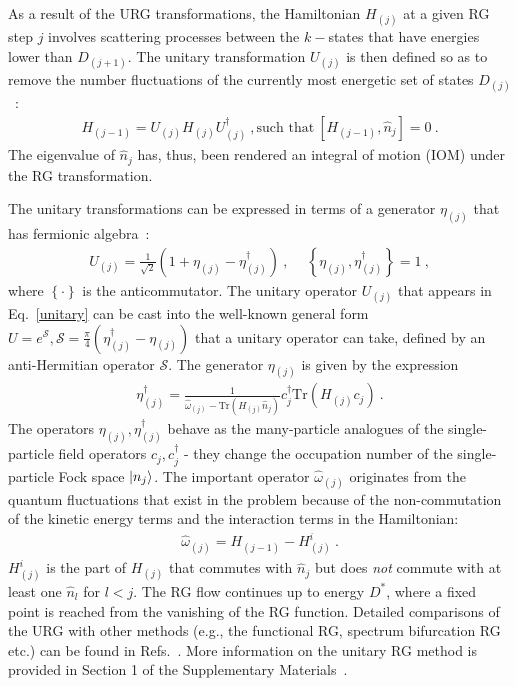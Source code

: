\documentclass{iopart}
\begin{document}
As a result of the URG transformations, the Hamiltonian \(H_{(j)}\) at a given RG step \(j\) involves scattering processes between the \(k-\)states that have energies lower than \(D_{(j+1)}\). The unitary transformation \(U_{(j)}\) is then defined so as to remove the number fluctuations of the currently most energetic set of states \(D_{(j)}\)~\cite{anirbanurg1,anirbanurg2}:
\begin{eqnarray}
	H_{(j-1)} = U_{(j)} H_{(j)} U^\dagger_{(j)}~, \text{such that} ~\left[H_{(j-1)}, \hat n_{j}\right] =0~.
\end{eqnarray}
The eigenvalue of $\hat{n}_{j}$ has, thus, been rendered an integral of motion (IOM) under the RG transformation.

The unitary transformations can be expressed in terms of a generator \(\eta_{(j)}\) that has fermionic algebra~\cite{anirbanurg1,anirbanurg2}:
\begin{eqnarray}
	\label{unitary}
	U_{(j)} = \frac{1}{\sqrt 2}\left(1 + \eta_{(j)} - \eta_{(j)}^\dagger\right)~,~ \quad\left\{ \eta_{(j)},\eta_{(j)}^\dagger \right\} = 1~,
\end{eqnarray}
where \(\left\{\cdot\right\}\) is the anticommutator. The unitary operator \(U_{(j)}\) that appears in Eq.~\eqref{unitary} can be cast into the well-known general form \(U = e^\mathcal{S}, \mathcal{S} = \frac{\pi}{4}\left( \eta^\dagger_{(j)} - \eta_{(j)} \right)\) that a unitary operator can take, defined by an anti-Hermitian operator \(\mathcal{S}\). The generator \(\eta_{(j)}\) is given by the expression~\cite{anirbanurg1,anirbanurg2}
\begin{eqnarray}
	\eta^\dagger_{(j)} = \frac{1}{\hat \omega_{(j)} - \text{Tr}\left(H_{(j)} \hat n_{j}\right) } c^\dagger_{j} \text{Tr}\left(H_{(j)}c_{j}\right)~.
\end{eqnarray}
The operators \(\eta_{(j)},\eta^\dagger_{(j)}\) behave as the many-particle analogues of the single-particle field operators \(c_j,c^\dagger_j\) - they change the occupation number of the single-particle Fock space \(\ket{n_j}\).  The important operator \(\hat \omega_{(j)}\) originates from the quantum fluctuations that exist in the problem because of the non-commutation of the kinetic energy terms and the interaction terms in the Hamiltonian:
\begin{eqnarray}
	\hat \omega_{(j)} = H_{(j-1)} - H^i_{(j)}~.
	\label{omega}
\end{eqnarray}
\(H^i_{(j)}\) is the part of \(H_{(j)}\) that commutes with \(\hat n_j\) but does {\it not} commute with at least one \(\hat n_l\) for \(l < j\). The RG flow continues up to energy \(D^*\), where a fixed point is reached from the vanishing of the RG function. 
Detailed comparisons of the URG with other methods (e.g., the functional RG, spectrum bifurcation RG etc.) can be found in Refs.~\cite{anirbanmott1,anirbanurg1}. More information on the unitary RG method is provided in Section 1 of the Supplementary Materials~\cite{supp_mat}.
\end{document}
